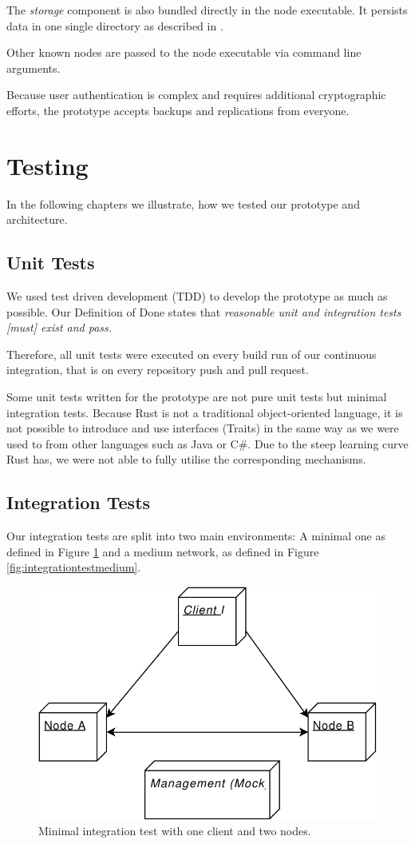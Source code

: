 The \emph{storage} component is also bundled directly in the node executable. It persists data in one single directory as described in .

Other known nodes are passed to the node executable via command line arguments.

Because user authentication is complex and requires additional cryptographic efforts, the prototype accepts backups and replications from everyone.

\section{Testing}\label{testing}

In the following chapters we illustrate, how we tested our prototype and architecture.

\subsection{Unit Tests}\label{unit-tests}
We used test driven development (TDD) to develop the prototype as much as possible. Our Definition of Done\cite{project-plan} states that \emph{reasonable unit and integration tests [must] exist and pass.}

Therefore, all unit tests were executed on every build run of our continuous integration, that is on every repository push and pull request.

Some unit tests written for the prototype are not pure unit tests but minimal integration tests. Because Rust is not a traditional object-oriented language, it is not possible to introduce and use interfaces (Traits) in the same way as we were used to from other languages such as Java or C#. Due to the steep learning curve Rust has, we were not able to fully utilise the corresponding mechanisms. 

\subsection{Integration Tests}\label{integration-tests}

Our integration tests are split into two main environments: A minimal one as defined in Figure \ref{fig:integrationtestsmall} and a medium network, as defined in Figure \ref{fig:integrationtestmedium}.

\begin{figure}
	\centering
	\includegraphics[width=0.5\linewidth]{resources/integration_test_small}
	\caption[Minimal integration test]{Minimal integration test with one client and two nodes.}
	\label{fig:integrationtestsmall}
\end{figure}

